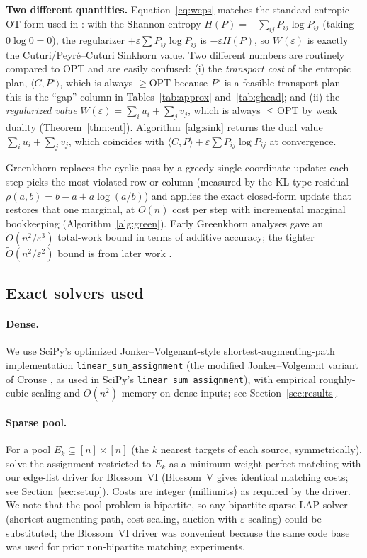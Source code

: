 \documentclass[11pt]{article}
\theoremstyle{remark}
\begin{document}
\textbf{Two different quantities.} Equation~\eqref{eq:weps} matches the
standard entropic-OT form used in \cite{cuturi2013,peyre2019}: with the
Shannon entropy $H(P)=-\sum_{ij} P_{ij}\log P_{ij}$ (taking $0\log 0=0$),
the regularizer $+\varepsilon\sum P_{ij}\log P_{ij}$ is $-\varepsilon H(P)$,
so $W(\varepsilon)$ is exactly the Cuturi/Peyr\'e--Cuturi Sinkhorn value.
Two different numbers are routinely compared to OPT and are easily confused:
(i) the \emph{transport cost} of the entropic plan, $\langle C,P^\varepsilon\rangle$,
which is always $\ge\mathrm{OPT}$ because $P^\varepsilon$ is a feasible
transport plan---this is the ``gap'' column in Tables~\ref{tab:approx}
and~\ref{tab:ghead}; and (ii) the \emph{regularized value}
$W(\varepsilon)=\sum_i u_i+\sum_j v_j$, which is always $\le\mathrm{OPT}$
by weak duality (Theorem~\ref{thm:ent}). Algorithm~\ref{alg:sink} returns
the dual value $\sum_i u_i+\sum_j v_j$, which coincides with
$\langle C,P\rangle+\varepsilon\sum P_{ij}\log P_{ij}$ at convergence.

Greenkhorn \cite{awr2017} replaces the cyclic pass by a greedy
single-coordinate update: each step picks the most-violated row or column
(measured by the KL-type residual $\rho(a,b)=b-a+a\log(a/b)$) and applies
the exact closed-form update that restores that one marginal, at $O(n)$
cost per step with incremental marginal bookkeeping
(Algorithm~\ref{alg:green}). Early Greenkhorn analyses
\cite{awr2017} gave an $\tilde O(n^2/\varepsilon^3)$ total-work bound in
terms of additive accuracy; the tighter $\tilde O(n^2/\varepsilon^2)$
bound is from later work \cite{lin2022}.

\subsection{Exact solvers used}
\paragraph{Dense.} We use SciPy's optimized Jonker--Volgenant-style
shortest-augmenting-path implementation \texttt{linear\_sum\_assignment}
\cite{jonker1987} (the modified Jonker--Volgenant variant of Crouse
\cite{crouse2016}, as used in SciPy's \texttt{linear\_sum\_assignment}),
with
empirical roughly-cubic scaling and $O(n^2)$ memory on dense inputs; see
Section~\ref{sec:results}.
\paragraph{Sparse pool.} For a pool $E_k\subseteq [n]\times[n]$ (the $k$
nearest targets of each source, symmetrically), solve the assignment
restricted to $E_k$ as a minimum-weight perfect matching with our
edge-list driver for Blossom~VI \cite{blossomvi} (Blossom~V \cite{blossomv}
gives identical matching costs; see Section~\ref{sec:setup}). Costs are
integer (milliunits) as required by the driver. We note that the pool
problem is bipartite, so any bipartite sparse LAP solver (shortest
augmenting path, cost-scaling, auction with $\varepsilon$-scaling) could be
substituted; the Blossom~VI driver was convenient because the same code
base was used for prior non-bipartite matching experiments.
\end{document}
